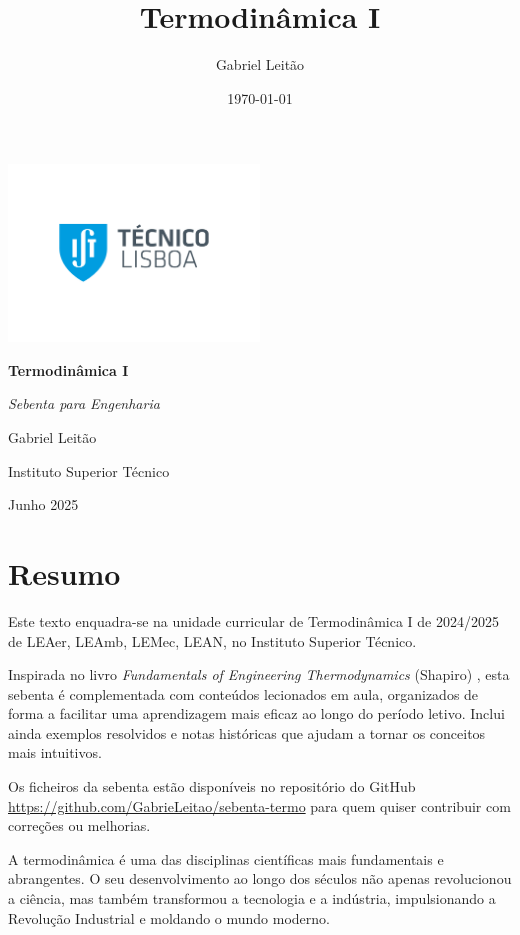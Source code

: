 \documentclass[a4paper,12pt, openany]{book}
\title{Termodinâmica I}
\author{Gabriel Leitão}
\date{\today}
\theoremstyle{mystyle}
\begin{document}
\frontmatter
\begin{titlepage}
    \centering
    \includegraphics[width=0.5\textwidth]{images/ist.jpg} %
    \vspace{2cm}

    {\Huge \bfseries Termodinâmica I\par}
    \vspace{1.5cm}
    {\Large \textit{Sebenta para Engenharia}\par}
    \vfill

    {\Large Gabriel Leitão\par}
    \vspace{0.5cm}
    {\large Instituto Superior Técnico\par}
    \vspace{0.5cm}
    {\large Junho 2025\par}
\end{titlepage}


\chapter*{Resumo}
Este texto enquadra-se na unidade curricular de Termodinâmica I de 2024/2025 de LEAer, LEAmb, LEMec, LEAN, no Instituto Superior Técnico. 

Inspirada no livro \emph{Fundamentals of Engineering Thermodynamics} (Shapiro) \cite{shapiro}, esta sebenta é complementada com conteúdos lecionados em aula, organizados de forma a facilitar uma aprendizagem mais eficaz ao longo do período letivo. Inclui ainda exemplos resolvidos e notas históricas que ajudam a tornar os conceitos mais intuitivos.

Os ficheiros da sebenta estão disponíveis no repositório do GitHub \url{https://github.com/GabrieLeitao/sebenta-termo} para quem quiser contribuir com correções ou melhorias.

A termodinâmica é uma das disciplinas científicas mais fundamentais e abrangentes. O seu desenvolvimento ao longo dos séculos não apenas revolucionou a ciência, mas também transformou a tecnologia e a indústria, impulsionando a Revolução Industrial e moldando o mundo moderno.
\end{document}

